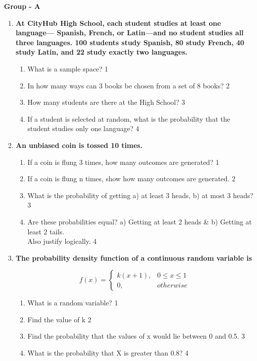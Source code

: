 \documentclass[12pt]{article}
\begin{document}
\begin{center}
\textbf{Group  - A}
\end{center}

  \begin{enumerate}
  
   \item
	  \textbf{At CityHub High School, each student studies at least one language— Spanish, French, or Latin—and no student studies all three languages. 100 students study Spanish, 80 study French, 40 study Latin, and 22 study exactly two languages.} 
  
  \begin{enumerate}
    \item What is a sample space? \hfill 1
    \item
In how many ways can 3 books be chosen from a set of 8 books? \hfill 2
    \item  
	How many students are there at the High School? \hfill 3
    \item
	If a student is selected at random, what is the probability that the student studies only one language? \hfill 4
  \end{enumerate}
  
    \item
	  \textbf{An unbiased coin is tossed 10 times.} 
  
  \begin{enumerate}
    \item
	If a coin is flung 3 times, how many outcomes are generated? \hfill 1
    \item
	If a coin is flung n times, show how many outcomes are generated. \hfill 2
    \item  
	What is the probability of getting a) at least 3 heads, b) at most 3 heads? \hfill 3
    \item
	Are these probabilities equal? a) Getting at least 2 heads \& b) Getting at least 2 tails. \\ Also justify logically. \hfill 4
  \end{enumerate}
  
    \item
  \textbf{The probability density function of a continuous random variable is}

$$
  f(x) =
\begin{cases}
k(x+1),  & 0 \le x \le 1 \\
0, & otherwise
\end{cases}
$$


  \begin{enumerate}
    \item
	What is a random variable? \hfill 1
    \item
    	Find the value of k \hfill 2
    \item
    	Find the probability that the values of x would lie between 0 and 0.5. \hfill 3
     \item
     	What is the probability that X is greater than 0.8?  \hfill 4
  \end{enumerate}
  



\end{enumerate}
\end{document}
